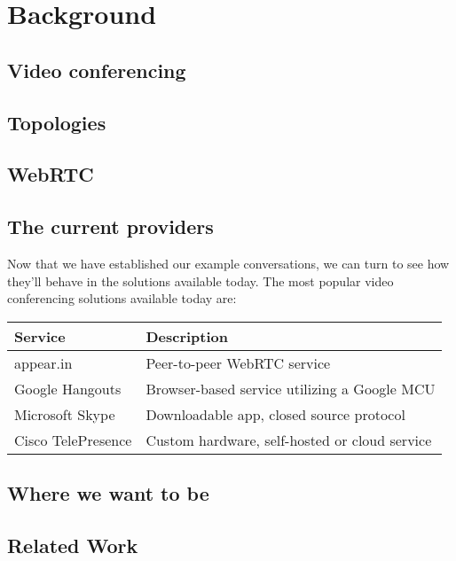 \chapter{Background}
\label{chp:background}

\section{Video conferencing}




\section{Topologies}



\section{WebRTC}



\section{The current providers}

Now that we have established our example conversations, we can turn to see how they'll behave in the solutions available today. The most popular video conferencing solutions available today are:

\begin{center}
	\label{tab:existing-solutions}
	\begin{tabular}{| l | l |}
		\hline
		\textbf{Service} & \textbf{Description} \\ \hline
		appear.in & Peer-to-peer WebRTC service \\ \hline
		Google Hangouts & Browser-based service utilizing a Google MCU \\ \hline
		Microsoft Skype & Downloadable app, closed source protocol \\ \hline
		Cisco TelePresence & Custom hardware, self-hosted or cloud service \\ \hline
	\end{tabular}
\end{center}



\section{Where we want to be}



\section{Related Work}

